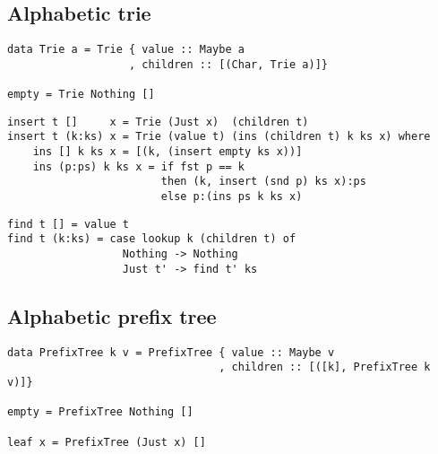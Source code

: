 \documentclass{article}
\begin{document}
\subsection{Alphabetic trie}

\lstset{language=Haskell}
\begin{lstlisting}[caption=Definition of alphabetic trie]
data Trie a = Trie { value :: Maybe a
                   , children :: [(Char, Trie a)]}

empty = Trie Nothing []
\end{lstlisting}

\lstset{language=Haskell}
\begin{lstlisting}[caption=Insertion to alphabetic trie]
insert t []     x = Trie (Just x)  (children t)
insert t (k:ks) x = Trie (value t) (ins (children t) k ks x) where
    ins [] k ks x = [(k, (insert empty ks x))]
    ins (p:ps) k ks x = if fst p == k
                        then (k, insert (snd p) ks x):ps
                        else p:(ins ps k ks x)
\end{lstlisting}

\lstset{language=Haskell}
\begin{lstlisting}[caption=Look up the alphabetic trie]
find t [] = value t
find t (k:ks) = case lookup k (children t) of
                  Nothing -> Nothing
                  Just t' -> find t' ks
\end{lstlisting}

\subsection{Alphabetic prefix tree}

\lstset{language=Haskell}
\begin{lstlisting}[caption=Alphabetic prefix tree definition]
data PrefixTree k v = PrefixTree { value :: Maybe v
                                 , children :: [([k], PrefixTree k v)]}

empty = PrefixTree Nothing []

leaf x = PrefixTree (Just x) []
\end{lstlisting}
\end{document}
